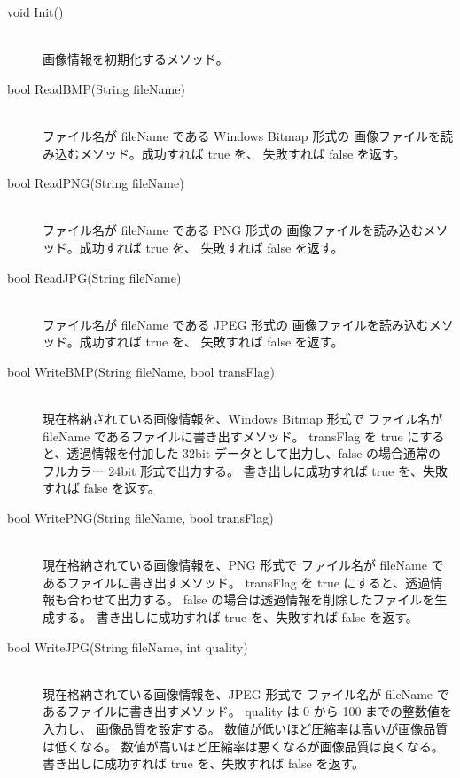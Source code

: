 \begin{description}
\item[void Init()] ~ \\
	画像情報を初期化するメソッド。\\

\item[bool ReadBMP(String fileName)] ~ \\
	ファイル名が fileName である Windows Bitmap 形式の
	画像ファイルを読み込むメソッド。成功すれば true を、
	失敗すれば false を返す。\\

\item[bool ReadPNG(String fileName)] ~ \\
	ファイル名が fileName である PNG 形式の
	画像ファイルを読み込むメソッド。成功すれば true を、
	失敗すれば false を返す。\\

\item[bool ReadJPG(String fileName)] ~ \\
	ファイル名が fileName である JPEG 形式の
	画像ファイルを読み込むメソッド。成功すれば true を、
	失敗すれば false を返す。\\

\item[bool WriteBMP(String fileName, bool transFlag)] ~ \\
	現在格納されている画像情報を、Windows Bitmap 形式で
	ファイル名が fileName であるファイルに書き出すメソッド。
	transFlag を true にすると、透過情報を付加した
	32bit データとして出力し、false の場合通常の
	フルカラー 24bit 形式で出力する。
	書き出しに成功すれば true を、失敗すれば false を返す。\\

\item[bool WritePNG(String fileName, bool transFlag)] ~ \\
	現在格納されている画像情報を、PNG 形式で
	ファイル名が fileName であるファイルに書き出すメソッド。
	transFlag を true にすると、透過情報も合わせて出力する。
	false の場合は透過情報を削除したファイルを生成する。
	書き出しに成功すれば true を、失敗すれば false を返す。\\

\item[bool WriteJPG(String fileName, int quality)] ~ \\
	現在格納されている画像情報を、JPEG 形式で
	ファイル名が fileName であるファイルに書き出すメソッド。
	quality は 0 から 100 までの整数値を入力し、
	画像品質を設定する。
	数値が低いほど圧縮率は高いが画像品質は低くなる。
	数値が高いほど圧縮率は悪くなるが画像品質は良くなる。
	書き出しに成功すれば true を、失敗すれば false を返す。\\


\end{description}
